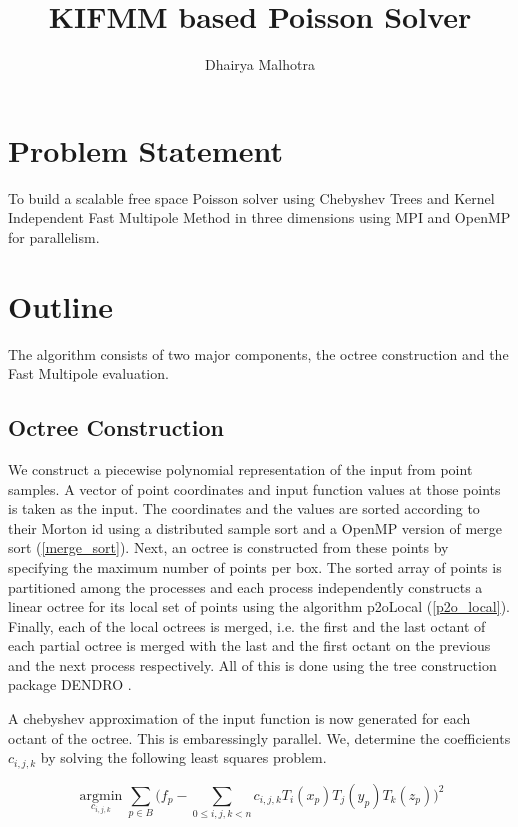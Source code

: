 \documentclass[11pt]{article}
\title{KIFMM based Poisson Solver}
\author{Dhairya Malhotra}
\begin{document}
\maketitle


\section{Problem Statement}
To build a scalable free space Poisson solver using Chebyshev Trees and Kernel 
Independent Fast Multipole Method in three dimensions using MPI and OpenMP for 
parallelism.

\section{Outline}
The algorithm consists of two major components, the octree construction and the 
Fast Multipole evaluation.


\subsection{Octree Construction}
We construct a piecewise polynomial representation of the input from point 
samples. A vector of point coordinates and input function values at those 
points is taken as the input. The coordinates and the values are sorted 
according to their Morton id using a distributed sample sort and a OpenMP 
version of merge sort (\ref{merge_sort}). Next, an octree is constructed from 
these points by specifying the maximum number of points per box. The sorted 
array of points is partitioned among the processes and each process 
independently constructs a linear octree for its local set of points using the 
algorithm p2oLocal (\ref{p2o_local}). Finally, each of the local octrees is 
merged, i.e. the first and the last octant of each partial octree is merged
with the last and the first octant on the previous and the next process 
respectively. All of this is done using the tree construction package DENDRO
\cite{Sampath_dendro:parallel}.


A chebyshev approximation of the input function is now generated for each 
octant of the octree. This is embaressingly parallel. We, determine the 
coefficients $c_{i,j,k}$ by solving the following least squares problem.

\begin{equation}
\underset{c_{i,j,k}}{\operatorname{argmin}}\sum_{p\in{B}}{\Big(f_p-\sum_{0 \le i,j,k<n}{c_{i,j,k}T_{i}(x_p)T_{j}(y_p)T_{k}(z_p)}\Big)^2}
\end{equation}
\end{document}
